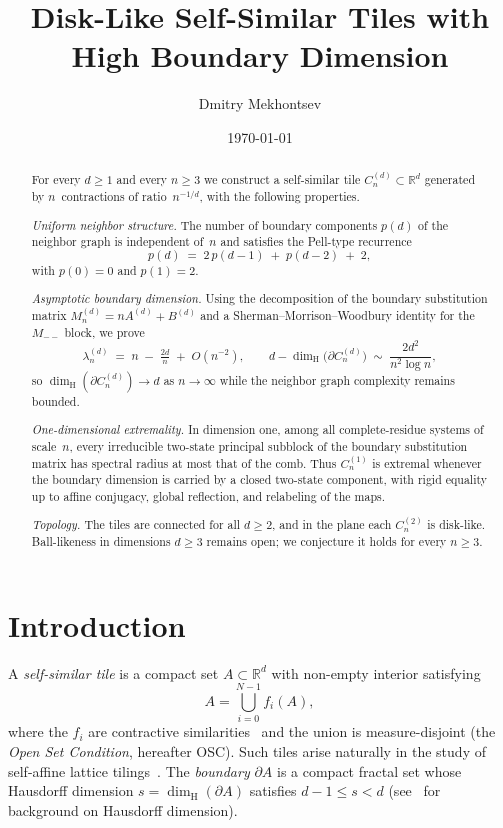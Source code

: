 \documentclass{amsart}
\title{Disk-Like Self-Similar Tiles with High Boundary Dimension}
\author{Dmitry Mekhontsev}
\date{\today}
\theoremstyle{definition}
\theoremstyle{remark}
\newcommand{\R}{\mathbb{R}}
\newcommand{\dH}{\dim_{\mathrm{H}}}
\begin{document}
\begin{abstract}
For every $d \ge 1$ and every $n \ge 3$ we construct a
self-similar tile $C_n^{(d)} \subset \R^d$ generated by
$n$~contractions of ratio~$n^{-1/d}$, with the following
properties.

\smallskip
\emph{Uniform neighbor structure.}  The number of boundary
components $p(d)$ of the neighbor graph is independent of~$n$ and
satisfies the Pell-type recurrence
\[
  p(d) \;=\; 2\,p(d{-}1) \;+\; p(d{-}2) \;+\; 2,
\]
with $p(0)=0$ and $p(1)=2$.

\smallskip
\emph{Asymptotic boundary dimension.}  Using the decomposition of the
boundary substitution matrix $M_n^{(d)} = n A^{(d)} + B^{(d)}$ and a
Sherman--Morrison--Woodbury identity for the $M_{--}$ block, we prove
\[
  \lambda_n^{(d)} \;=\; n \;-\; \tfrac{2d}{n} \;+\; O(n^{-2}),
  \qquad
  d - \dH\bigl(\partial C_n^{(d)}\bigr)
    \;\sim\; \frac{2 d^2}{n^2 \log n},
\]
so $\dH(\partial C_n^{(d)}) \to d$ as $n \to \infty$ while the
neighbor graph complexity remains bounded.

\smallskip
\emph{One-dimensional extremality.}  In dimension one, among all
complete-residue systems of scale~$n$, every irreducible two-state
principal subblock of the boundary substitution matrix has spectral
radius at most that of the comb.  Thus $C_n^{(1)}$ is extremal whenever
the boundary dimension is carried by a closed two-state component, with
rigid equality up to affine conjugacy, global reflection, and relabeling
of the maps.

\smallskip
\emph{Topology.}  The tiles are connected for all $d \ge 2$, and in
the plane each $C_n^{(2)}$ is disk-like.  Ball-likeness in dimensions
$d \ge 3$ remains open; we conjecture it holds for every $n \ge 3$.
\end{abstract}

\maketitle

\section{Introduction}
\label{sec:intro}

A \emph{self-similar tile} is a compact set $A \subset \R^d$ with
non-empty interior satisfying
\[
  A = \bigcup_{i=0}^{N-1} f_i(A),
\]
where the $f_i$ are contractive similarities~\cite{hutchinson} and the union is
measure-disjoint (the \emph{Open Set Condition}, hereafter OSC).
Such tiles arise naturally in the study of
self-affine lattice tilings~\cite{lagarias-wang}.
The \emph{boundary} $\partial A$ is a compact fractal set whose
Hausdorff dimension $s = \dH(\partial A)$ satisfies
$d - 1 \le s < d$
(see~\cite{falconer} for background on Hausdorff dimension).
\end{document}
